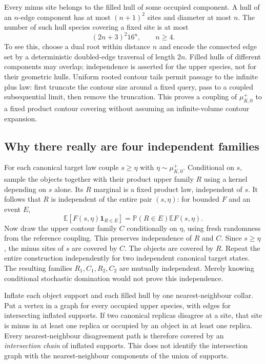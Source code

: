\documentclass[11pt,reqno]{amsart}
\numberwithin{equation}{section}
\theoremstyle{definition}
\theoremstyle{remark}
\newcommand{\E}{\mathbb E}
\newcommand{\Prob}{\mathbb P}
\newcommand{\one}{\mathbf1}
\begin{document}
Every minus site belongs to the filled hull of some occupied component. A hull of an $n$-edge component has at most $(n+1)^2$ sites and diameter at most $n$. The number of such hull species covering a fixed site is at most
\begin{equation}\label{eq:contourcount}
 (2n+3)^2 16^n,\qquad n\geq4.
\end{equation}
To see this, choose a dual root within distance $n$ and encode the connected edge set by a deterministic doubled-edge traversal of length $2n$. Filled hulls of different components may overlap; independence is asserted for the upper species, not for their geometric hulls. Uniform rooted contour tails permit passage to the infinite plus law: first truncate the contour size around a fixed query, pass to a coupled subsequential limit, then remove the truncation. This proves a coupling of $\mu_{K,0}^+$ to a fixed product contour covering without assuming an infinite-volume contour expansion.

\subsection{Why there really are four independent families}\label{sec:independence}
For each canonical target law couple $s\geq\eta$ with $\eta\sim\mu_{K,0}^+$. Conditional on $s$, sample the objects together with their product upper family $R$ using a kernel depending on $s$ alone. Its $R$ marginal is a fixed product law, independent of $s$. It follows that $R$ is independent of the entire pair $(s,\eta)$: for bounded $F$ and an event $E$,
\[
 \E[F(s,\eta)\one_{R\in E}]=\Prob(R\in E)\E F(s,\eta).
\]
Now draw the upper contour family $C$ conditionally on $\eta$, using fresh randomness from the reference coupling. This preserves independence of $R$ and $C$. Since $s\geq\eta$, the minus sites of $s$ are covered by $C$. The objects are covered by $R$. Repeat the entire construction independently for two independent canonical target states. The resulting families $R_1,C_1,R_2,C_2$ are mutually independent. Merely knowing conditional stochastic domination would not prove this independence.

Inflate each object support and each filled hull by one nearest-neighbour collar. Put a vertex in a graph for every occupied upper species, with edges for intersecting inflated supports. If two canonical replicas disagree at a site, that site is minus in at least one replica or occupied by an object in at least one replica. Every nearest-neighbour disagreement path is therefore covered by an \emph{intersection chain} of inflated supports. This does not identify the intersection graph with the nearest-neighbour components of the union of supports.
\end{document}
